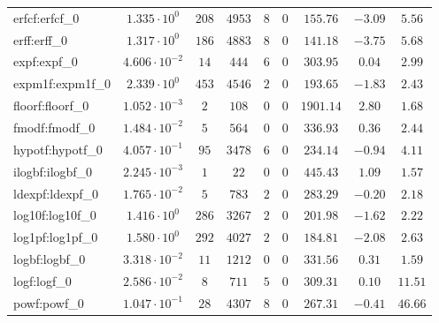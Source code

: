 \begin{tabular}{|l|c|c|c|c|c|c|c|c|}
erfcf:erfcf\_0               & $ 1.335 \cdot 10^{0}  $ & $ 208    $ & $ 4953   $ & $ 8   $ & $ 0   $ & $ 155.76      $ & $ -3.09   $ & $ 5.56    $ \\
erff:erff\_0                 & $ 1.317 \cdot 10^{0}  $ & $ 186    $ & $ 4883   $ & $ 8   $ & $ 0   $ & $ 141.18      $ & $ -3.75   $ & $ 5.68    $ \\
expf:expf\_0                 & $ 4.606 \cdot 10^{-2} $ & $ 14     $ & $ 444    $ & $ 6   $ & $ 0   $ & $ 303.95      $ & $ 0.04    $ & $ 2.99    $ \\
expm1f:expm1f\_0             & $ 2.339 \cdot 10^{0}  $ & $ 453    $ & $ 4546   $ & $ 2   $ & $ 0   $ & $ 193.65      $ & $ -1.83   $ & $ 2.43    $ \\
floorf:floorf\_0             & $ 1.052 \cdot 10^{-3} $ & $ 2      $ & $ 108    $ & $ 0   $ & $ 0   $ & $ 1901.14     $ & $ 2.80    $ & $ 1.68    $ \\
fmodf:fmodf\_0               & $ 1.484 \cdot 10^{-2} $ & $ 5      $ & $ 564    $ & $ 0   $ & $ 0   $ & $ 336.93      $ & $ 0.36    $ & $ 2.44    $ \\
hypotf:hypotf\_0             & $ 4.057 \cdot 10^{-1} $ & $ 95     $ & $ 3478   $ & $ 6   $ & $ 0   $ & $ 234.14      $ & $ -0.94   $ & $ 4.11    $ \\
ilogbf:ilogbf\_0             & $ 2.245 \cdot 10^{-3} $ & $ 1      $ & $ 22     $ & $ 0   $ & $ 0   $ & $ 445.43      $ & $ 1.09    $ & $ 1.57    $ \\
ldexpf:ldexpf\_0             & $ 1.765 \cdot 10^{-2} $ & $ 5      $ & $ 783    $ & $ 2   $ & $ 0   $ & $ 283.29      $ & $ -0.20   $ & $ 2.18    $ \\
log10f:log10f\_0             & $ 1.416 \cdot 10^{0}  $ & $ 286    $ & $ 3267   $ & $ 2   $ & $ 0   $ & $ 201.98      $ & $ -1.62   $ & $ 2.22    $ \\
log1pf:log1pf\_0             & $ 1.580 \cdot 10^{0}  $ & $ 292    $ & $ 4027   $ & $ 2   $ & $ 0   $ & $ 184.81      $ & $ -2.08   $ & $ 2.63    $ \\
logbf:logbf\_0               & $ 3.318 \cdot 10^{-2} $ & $ 11     $ & $ 1212   $ & $ 0   $ & $ 0   $ & $ 331.56      $ & $ 0.31    $ & $ 1.59    $ \\
logf:logf\_0                 & $ 2.586 \cdot 10^{-2} $ & $ 8      $ & $ 711    $ & $ 5   $ & $ 0   $ & $ 309.31      $ & $ 0.10    $ & $ 11.51   $ \\
powf:powf\_0                 & $ 1.047 \cdot 10^{-1} $ & $ 28     $ & $ 4307   $ & $ 8   $ & $ 0   $ & $ 267.31      $ & $ -0.41   $ & $ 46.66   $ \\

\end{tabular}
